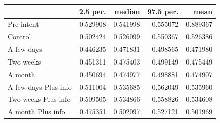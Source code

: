 \begin{tabular}{lrrrr}
\toprule
 & 2.5 per. & median & 97.5 per. & mean \\
\midrule
Pre-intent & 0.529908 & 0.541998 & 0.555072 & 0.889367 \\
Control & 0.502424 & 0.526099 & 0.550367 & 0.526386 \\
A few days & 0.446235 & 0.471831 & 0.498565 & 0.471980 \\
Two weeks & 0.451311 & 0.475403 & 0.499149 & 0.475449 \\
A month & 0.450694 & 0.474977 & 0.498881 & 0.474907 \\
A few days
Plus info & 0.511004 & 0.535685 & 0.562049 & 0.535960 \\
Two weeks
Plus info & 0.509505 & 0.534866 & 0.558826 & 0.534608 \\
A month
Plus info & 0.475351 & 0.502097 & 0.527121 & 0.501969 \\
\bottomrule
\end{tabular}
